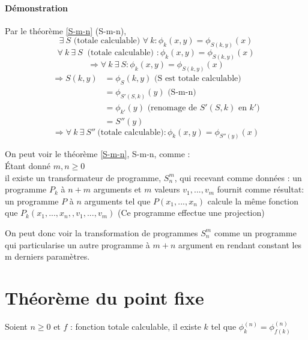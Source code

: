 \paragraph{Démonstration}
	Par le théorème \ref{S-m-n} (S-m-n),
	\[ \exists \ S \text{ (totale calculable) } \forall \ k : \phi_k(x,y)=\phi_{S(k,y)}(x)\]
	\[ \forall \ k \ \exists \ S \ \text{ (totale calculable) } : \phi_k(x,y)=\phi_{S(k,y)}(x)\]
	\[ \Rightarrow \forall \ k \ \exists \ S : \phi_k(x,y) =\phi_{S(k,y)}(x) \]
	\begin{align}
		\Rightarrow S(k,y) &= \phi_{S}(k,y) \text{ (S est totale calculable)}\\
		&= \phi_{S'(S,k)}(y) \text{ (S-m-n)}\\
		&= \phi_{k'}(y) \text{ (renomage de } S'(S,k) \text{ en } k' \text{)}\\
		&= S''(y)
	\end{align}
	\[ \Rightarrow \forall \ k \ \exists \ S'' \ \text{(totale calculable)} :
       	\phi_k(x,y)=\phi_{S''(y)}(x)\]

\begin{myrem}
	On peut voir le théorème \ref{S-m-n}, S-m-n, comme : \\
	Étant donné $m,n \geq 0$\\
	il existe un transformateur de programme, $S^m_n$, qui recevant comme
	données : un programme $P_k$ à $n+m$ arguments et $m$ valeurs $v_1,...,v_m$
	fournit comme résultat: un programme $P$ à $n$ arguments tel que
	$P(x_1,...,x_n)$ calcule la même fonction que
	$P_k(x_1,...,x_n,,v_1,...,v_m)$ (Ce programme effectue une projection)
\end{myrem}

\begin{myrem}
	On peut donc voir la transformation de programmes $S^m_n$ comme un
	programme qui particularise un autre programme à $m+n$ argument en rendant
	constant les m derniers paramètres.
\end{myrem}

\section{Théorème du point fixe}
\label{sub:th_or_me_du_point_fixe}
\begin{mytheo}
	\label{point-fixe}
    Soient $n \geq 0$ et $f$ : fonction totale
	calculable, il existe $k$ tel que $\phi^{(n)}_k = \phi^{(n)}_{f(k)}$
\end{mytheo}

